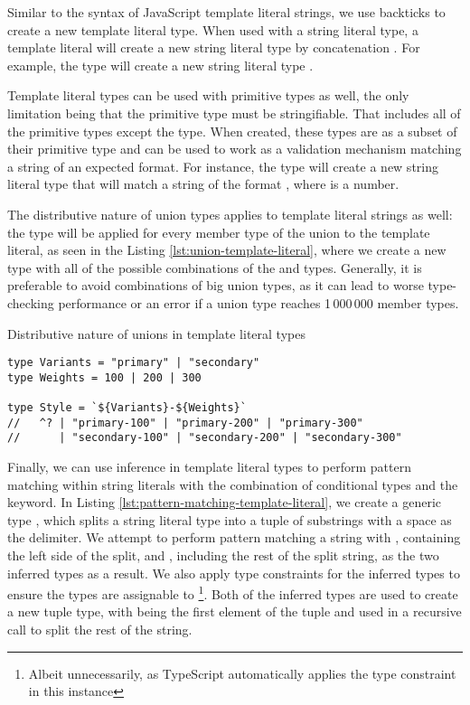 Similar to the syntax of JavaScript template literal strings, we use backticks to create a new template literal type. When used with a string literal type, a template literal will create a new string literal type by concatenation \cite{DocumentationTemplateLiteral}. For example, the type  will create a new string literal type .

Template literal types can be used with primitive types as well, the only limitation being that the primitive type must be stringifiable. That includes all of the primitive types except the  type. When created, these types are as a subset of their primitive type and can be used to work as a validation mechanism matching a string of an expected format. For instance, the type  will create a new string literal type that will match a string of the format , where  is a number.

The distributive nature of union types applies to template literal strings as well: the type will be applied for every member type of the union to the template literal, as seen in the Listing \ref{lst:union-template-literal}, where we create a new  type with all of the possible combinations of the  and  types. Generally, it is preferable to avoid combinations of big union types, as it can lead to worse type-checking performance or an error if a union type reaches 1\,000\,000 member types.

\begin{listing}[ht]
  \caption{Distributive nature of unions in template literal types}\label{lst:union-template-literal}
  \begin{verbatim}
type Variants = "primary" | "secondary"
type Weights = 100 | 200 | 300

type Style = `${Variants}-${Weights}`
//   ^? | "primary-100" | "primary-200" | "primary-300" 
//      | "secondary-100" | "secondary-200" | "secondary-300"
\end{verbatim}
\end{listing}

Finally, we can use inference in template literal types to perform pattern matching within string literals with the combination of conditional types and the  keyword. In Listing \ref{lst:pattern-matching-template-literal}, we create a generic type , which splits a string literal type into a tuple of substrings with a space as the delimiter. We attempt to perform pattern matching a string with , containing the left side of the split, and , including the rest of the split string, as the two inferred types as a result. We also apply type constraints for the inferred types to ensure the types are assignable to \footnote{Albeit unnecessarily, as TypeScript automatically applies the  type constraint in this instance}. Both of the inferred types are used to create a new tuple type, with  being the first element of the tuple and  used in a recursive call to split the rest of the string.

